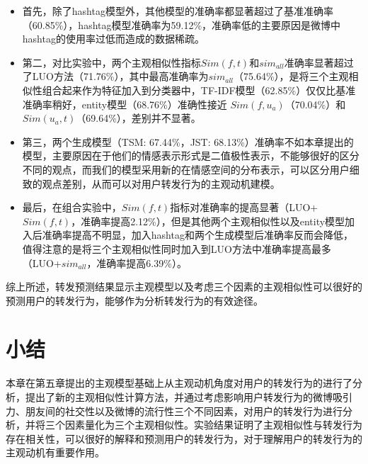 \begin{itemize}
\item 首先，除了hashtag模型外，其他模型的准确率都显著超过了基准准确率（60.85\%），hashtag模型准确率为59.12\%，准确率低的主要原因是微博中hashtag的使用率过低而造成的数据稀疏。
\item 第二，对比实验中，两个主观相似性指标$ Sim(f,t) $和$ sim_{all}  $准确率显著超过了LUO方法（71.76\%），其中最高准确率为$ sim_{all}  $（75.64\%），是将三个主观相似性组合起来作为特征加入到分类器中，TF-IDF模型（62.85\%）仅仅比基准准确率稍好，entity模型（68.76\%）准确性接近 $ Sim(f,u_a)$（70.04\%）和$ Sim(u_a,t)  $（69.64\%），差别并不显著。
\item 第三，两个生成模型（TSM: 67.44\%，JST: 68.13\%）准确率不如本章提出的模型，主要原因在于他们的情感表示形式是二值极性表示，不能够很好的区分不同的观点，而我们的模型采用新的在情感空间的分布表示，可以区分用户细致的观点差别，从而可以对用户转发行为的主观动机建模。
\item 最后，在组合实验中，$ Sim(f,t) $指标对准确率的提高显著（LUO+$ Sim(f,t) $，准确率提高2.12\%），但是其他两个主观相似性以及entity模型加入后准确率提高不明显，加入hashtag和两个生成模型后准确率反而会降低，值得注意的是将三个主观相似性同时加入到LUO方法中准确率提高最多（LUO+$ sim_{all}  $，准确率提高6.39\%）。
\end{itemize}

综上所述，转发预测结果显示主观模型以及考虑三个因素的主观相似性可以很好的预测用户的转发行为，能够作为分析转发行为的有效途径。

\section{小结}
本章在第五章提出的主观模型基础上从主观动机角度对用户的转发行为的进行了分析，提出了新的主观相似性计算方法，并通过考虑影响用户转发行为的微博吸引力、朋友间的社交性以及微博的流行性三个不同因素，对用户的转发行为进行分析，并将三个因素量化为三个主观相似性。实验结果证明了主观相似性与转发行为存在相关性，可以很好的解释和预测用户的转发行为，对于理解用户的转发行为的主观动机有重要作用。

